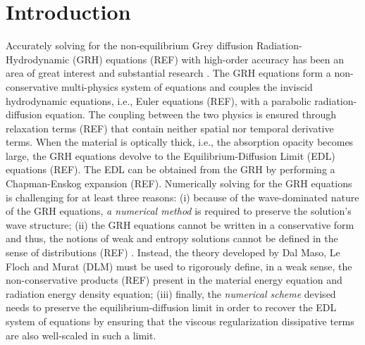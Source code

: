 \documentclass[times,doublespace]{fldauth}%
\begin{document}
\section{Introduction}\label{sec:intro}
%
Accurately solving for the non-equilibrium Grey diffusion Radiation-Hydrodynamic (GRH) equations (REF) with 
high-order accuracy has been an area of great interest and substantial research 
. 
The GRH equations form a non-conservative multi-physics system of equations and couples the inviscid 
hydrodynamic equations, i.e., Euler equations (REF), with a parabolic 
radiation-diffusion equation. The coupling between the two physics is ensured through relaxation terms (REF) 
that contain neither spatial nor temporal derivative terms. When the material is optically thick, i.e., 
the absorption opacity becomes large, the GRH equations devolve to the Equilibrium-Diffusion Limit (EDL) 
equations (REF). The EDL can be obtained from the GRH by performing a Chapman-Enskog expansion (REF).
Numerically solving for the GRH equations is challenging for at least three reasons: (i) because of the 
wave-dominated nature of the GRH equations, \emph{a numerical method} is required to preserve the 
solution's wave structure; 
(ii) the GRH equations cannot be written in a conservative form and thus, the notions of weak and entropy 
solutions cannot be defined in the sense of distributions (REF) . Instead, the theory developed by Dal Maso, Le Floch and Murat (DLM) must be used to
rigorously define, in a weak sense, the non-conservative products (REF) present in the material energy equation 
and radiation energy density equation;
(iii) finally, the \emph{numerical scheme} devised needs to preserve the equilibrium-diffusion limit in order to recover the EDL system of equations by ensuring that the viscous regularization dissipative terms are also
well-scaled in such a limit.
%
\end{document}
